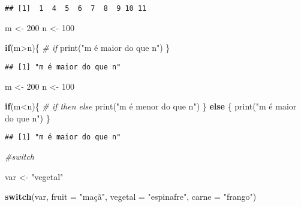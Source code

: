 \documentclass[
]{article}
\newenvironment{Shaded}{\begin{snugshade}}{\end{snugshade}}
\newcommand{\AttributeTok}[1]{\textcolor[rgb]{0.77,0.63,0.00}{#1}}
\newcommand{\CommentTok}[1]{\textcolor[rgb]{0.56,0.35,0.01}{\textit{#1}}}
\newcommand{\ControlFlowTok}[1]{\textcolor[rgb]{0.13,0.29,0.53}{\textbf{#1}}}
\newcommand{\DecValTok}[1]{\textcolor[rgb]{0.00,0.00,0.81}{#1}}
\newcommand{\FunctionTok}[1]{\textcolor[rgb]{0.00,0.00,0.00}{#1}}
\newcommand{\NormalTok}[1]{#1}
\newcommand{\OtherTok}[1]{\textcolor[rgb]{0.56,0.35,0.01}{#1}}
\newcommand{\SpecialCharTok}[1]{\textcolor[rgb]{0.00,0.00,0.00}{#1}}
\newcommand{\StringTok}[1]{\textcolor[rgb]{0.31,0.60,0.02}{#1}}
\begin{document}
\begin{verbatim}
## [1]  1  4  5  6  7  8  9 10 11
\end{verbatim}

\begin{Shaded}
\begin{Highlighting}[]
\NormalTok{m }\OtherTok{\textless{}{-}} \DecValTok{200}
\NormalTok{n }\OtherTok{\textless{}{-}} \DecValTok{100}

\ControlFlowTok{if}\NormalTok{(m}\SpecialCharTok{\textgreater{}}\NormalTok{n)\{ }\CommentTok{\# if}
  \FunctionTok{print}\NormalTok{(}\StringTok{"m é maior do que n"}\NormalTok{)}
\NormalTok{\}}
\end{Highlighting}
\end{Shaded}

\begin{verbatim}
## [1] "m é maior do que n"
\end{verbatim}

\begin{Shaded}
\begin{Highlighting}[]
\NormalTok{m }\OtherTok{\textless{}{-}} \DecValTok{200}
\NormalTok{n }\OtherTok{\textless{}{-}} \DecValTok{100}

\ControlFlowTok{if}\NormalTok{(m}\SpecialCharTok{\textless{}}\NormalTok{n)\{ }\CommentTok{\# if then else}
  \FunctionTok{print}\NormalTok{(}\StringTok{"m é menor do que n"}\NormalTok{)}
\NormalTok{\} }\ControlFlowTok{else}\NormalTok{ \{}
  \FunctionTok{print}\NormalTok{(}\StringTok{"m é maior do que n"}\NormalTok{)}
\NormalTok{\}}
\end{Highlighting}
\end{Shaded}

\begin{verbatim}
## [1] "m é maior do que n"
\end{verbatim}

\begin{Shaded}
\begin{Highlighting}[]
\CommentTok{\#switch}

\NormalTok{var }\OtherTok{\textless{}{-}} \StringTok{"vegetal"}

\ControlFlowTok{switch}\NormalTok{(var,}
       \AttributeTok{fruit =} \StringTok{"maçã"}\NormalTok{,}
       \AttributeTok{vegetal =} \StringTok{"espinafre"}\NormalTok{,}
       \AttributeTok{carne =} \StringTok{"frango"}\NormalTok{)}
\end{Highlighting}
\end{Shaded}
\end{document}
